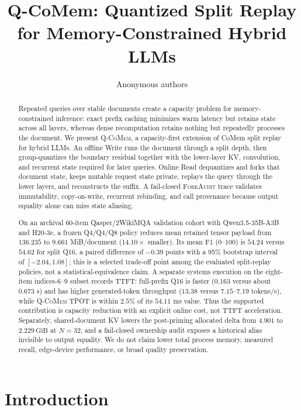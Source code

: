 \documentclass{article}
\title{Q-CoMem: Quantized Split Replay for Memory-Constrained Hybrid LLMs}
\author{Anonymous authors}
\newcommand{\qcomem}{\textsc{Q-CoMem}}
\newcommand{\method}{\textsc{ForkAudit}}
\newcommand{\gib}{\,\mathrm{GiB}}
\begin{document}
\raggedbottom
\maketitle

\begin{abstract}
Repeated queries over stable documents create a capacity problem for
memory-constrained inference: exact prefix caching minimizes warm latency but
retains state across all layers, whereas dense recomputation retains nothing
but repeatedly processes the document.  We present \qcomem{}, a capacity-first
extension of CoMem split replay for hybrid LLMs.  An offline Write runs the
document through a split depth, then group-quantizes the boundary residual
together with the lower-layer KV, convolution, and recurrent state required for
later queries.  Online Read dequantizes and forks that document state, keeps
mutable request state private, replays the query through the lower layers, and
reconstructs the suffix.  A fail-closed \method{} trace validates immutability,
copy-on-write, recurrent rebinding, and call provenance because output equality
alone can miss state aliasing.

On an archival 60-item Qasper/2WikiMQA validation cohort with
Qwen3.5-35B-A3B and H20-3e, a frozen Q4/Q4/Q8 policy reduces mean retained
tensor payload from $136.235$ to $9.661$ MiB/document ($14.10\times$ smaller).
Its mean F1 (0--100) is $54.24$ versus $54.62$ for split Q16, a paired difference of
$-0.39$ points with a 95\% bootstrap interval of $[-2.04,1.08]$; this is a
selected trade-off point among the evaluated split-replay policies, not a
statistical-equivalence claim.  A separate systems execution on the eight-item
indices-6--9 subset records TTFT: full-prefix Q16 is faster
($0.163$ versus about $0.673$ s) and has higher generated-token throughput
($13.38$ versus $7.15$--$7.19$ tokens/s), while \qcomem{} TPOT is within $2.5\%$
of its $54.11$ ms value.  Thus the supported contribution is
capacity reduction with an explicit online cost, not TTFT acceleration.
Separately, shared-document KV lowers the post-priming allocated delta from
$4.901$ to $2.229\gib$ at $N=32$, and a fail-closed ownership audit exposes a
historical alias invisible to output equality.  We do not claim lower total
process memory, measured recall, edge-device performance, or broad quality
preservation.
\end{abstract}

\section{Introduction}
\label{sec:intro}
\end{document}
